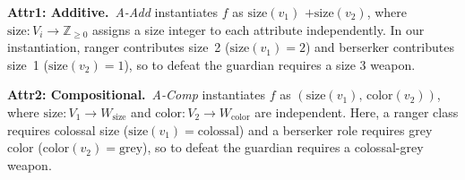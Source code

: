 \documentclass[11pt]{article}
\begin{document}


\noindent\textbf{Attr1: Additive.}~\textit{A-Add} instantiates $f$ as $\text{size}(v_1)$ ${+} \text{size}(v_2)$, where $\text{size}{:}V_i{\to}\mathbb{Z}_{\geq 0}$ assigns a size integer to each attribute independently. In our instantiation, ranger contributes size~2 ($\text{size}(v_1){=}2$) and berserker contributes size~1 ($\text{size}(v_2){=}1$), so to defeat the guardian requires a size 3 weapon.

\noindent\textbf{Attr2: Compositional.}~\textit{A-Comp} instantiates $f$ as $(\text{size}(v_1),\,\text{color}(v_2))$, where $\text{size}{:}V_1{\to}W_\text{size}$ and $\text{color}{:}V_2{\to}W_\text{color}$ are independent. Here, a ranger class requires colossal size ($\text{size}(v_1){=}\text{colossal}$) and a berserker role requires grey color ($\text{color}(v_2){=}\text{grey}$), so to defeat the guardian requires a colossal-grey weapon.
\end{document}
